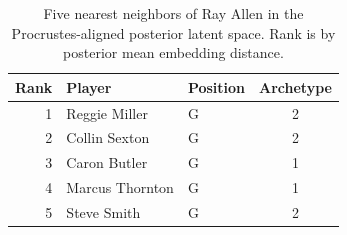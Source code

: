 \begin{table}[htbp]
  \centering\small
  \begin{tabular}{rllc}
    \toprule
    Rank & Player & Position & Archetype \\
    \midrule
    1 & Reggie Miller & G & 2 \\
    2 & Collin Sexton & G & 2 \\
    3 & Caron Butler & G & 1 \\
    4 & Marcus Thornton & G & 1 \\
    5 & Steve Smith & G & 2 \\
    \bottomrule
  \end{tabular}
  \caption{Five nearest neighbors of Ray Allen in the Procrustes-aligned posterior latent space. Rank is by posterior mean embedding distance.}
  \label{tab:Ray_Allen_neighbors}
\end{table}

